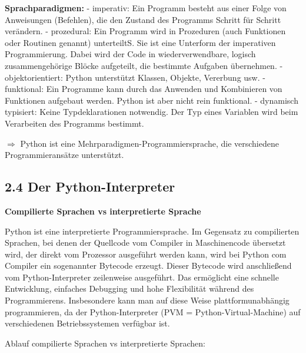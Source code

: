 \documentclass[
  11pt,
  a4paper,
  DIV=11,
  numbers=noendperiod]{scrartcl}
\begin{document}
\textbf{Sprachparadigmen:} - imperativ: Ein Programm besteht aus einer
Folge von Anweisungen (Befehlen), die den Zustand des Programms Schritt
für Schritt verändern. - prozedural: Ein Programm wird in Prozeduren
(auch Funktionen oder Routinen genannt) unterteiltS. Sie ist eine
Unterform der imperativen Programmierung. Dabei wird der Code in
wiederverwendbare, logisch zusammengehörige Blöcke aufgeteilt, die
bestimmte Aufgaben übernehmen. - objektorientiert: Python unterstützt
Klassen, Objekte, Vererbung usw. - funktional: Ein Programme kann durch
das Anwenden und Kombinieren von Funktionen aufgebaut werden. Python ist
aber nicht rein funktional. - dynamisch typisiert: Keine
Typdeklarationen notwendig. Der Typ eines Variablen wird beim
Verarbeiten des Programms bestimmt.

\(\Rightarrow\) Python ist eine Mehrparadigmen-Programmiersprache, die
verschiedene Programmieransätze unterstützt.

\subsection{2.4 Der Python-Interpreter}\label{der-python-interpreter}

\textbf{Compilierte Sprachen vs interpretierte Sprache}

Python ist eine interpretierte Programmiersprache. Im Gegensatz zu
compilierten Sprachen, bei denen der Quellcode vom Compiler in
Maschinencode übersetzt wird, der direkt vom Prozessor ausgeführt werden
kann, wird bei Python com Compiler ein sogenannter Bytecode erzeugt.
Dieser Bytecode wird anschließend vom Python-Interpreter zeilenweise
ausgeführt. Das ermöglicht eine schnelle Entwicklung, einfaches
Debugging und hohe Flexibilität während des Programmierens. Insbesondere
kann man auf diese Weise plattformunabhängig programmieren, da der
Python-Interpreter (PVM = Python-Virtual-Machine) auf verschiedenen
Betriebssystemen verfügbar ist.

Ablauf compilierte Sprachen vs interpretierte Sprachen:
\end{document}
